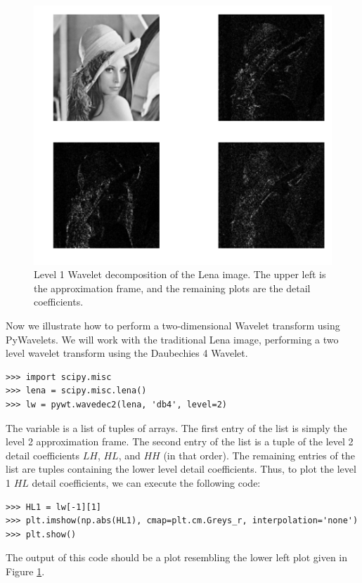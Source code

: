 \begin{figure}[t]
    \includegraphics[width=\linewidth]{dwt2.pdf}
    \caption{Level 1 Wavelet decomposition of the Lena image.
    The upper left is the approximation frame, and the remaining
    plots are the detail coefficients.}
    \label{fig:dwt2}
\end{figure}

Now we illustrate how to perform a two-dimensional Wavelet transform using
PyWavelets. We will work with the traditional Lena image, performing a
two level wavelet transform using the Daubechies 4 Wavelet.
\begin{lstlisting}
>>> import scipy.misc
>>> lena = scipy.misc.lena()
>>> lw = pywt.wavedec2(lena, 'db4', level=2)
\end{lstlisting}
The variable  is a list of tuples of arrays. The first entry of the list is
simply the level 2 approximation frame. The second entry of the list is a tuple of
the level 2 detail coefficients $LH$, $HL$, and $HH$ (in that order). The remaining
entries of the list are tuples containing the lower level detail coefficients.
Thus, to plot the level 1 $HL$ detail coefficients, we can execute the following code:
\begin{lstlisting}
>>> HL1 = lw[-1][1]
>>> plt.imshow(np.abs(HL1), cmap=plt.cm.Greys_r, interpolation='none')
>>> plt.show()
\end{lstlisting}
The output of this code should be a plot resembling the lower left plot given in Figure
\ref{fig:dwt2}.

